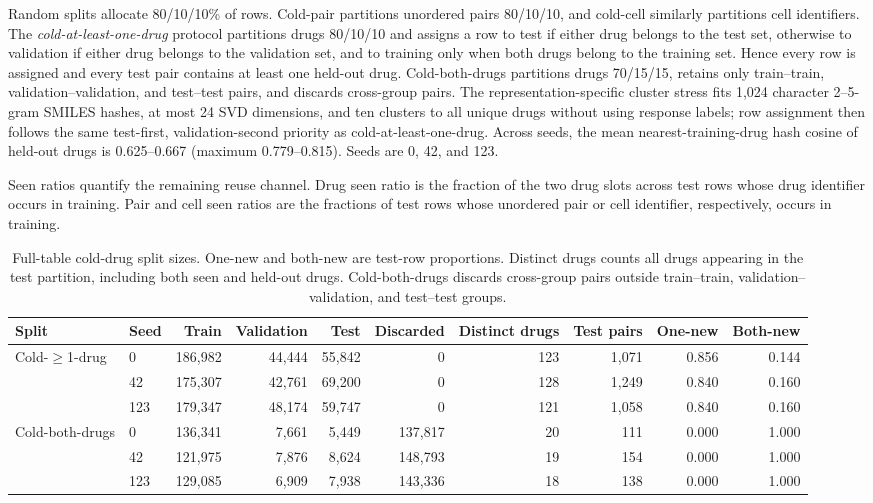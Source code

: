 \documentclass[conference]{IEEEtran}
\begin{document}
Random splits allocate 80/10/10\% of rows. Cold-pair partitions unordered pairs 80/10/10, and cold-cell similarly partitions cell identifiers. The \emph{cold-at-least-one-drug} protocol partitions drugs 80/10/10 and assigns a row to test if either drug belongs to the test set, otherwise to validation if either drug belongs to the validation set, and to training only when both drugs belong to the training set. Hence every row is assigned and every test pair contains at least one held-out drug. Cold-both-drugs partitions drugs 70/15/15, retains only train--train, validation--validation, and test--test pairs, and discards cross-group pairs. The representation-specific cluster stress fits 1,024 character 2--5-gram SMILES hashes, at most 24 SVD dimensions, and ten clusters to all unique drugs without using response labels; row assignment then follows the same test-first, validation-second priority as cold-at-least-one-drug. Across seeds, the mean nearest-training-drug hash cosine of held-out drugs is 0.625--0.667 (maximum 0.779--0.815). Seeds are 0, 42, and 123.

Seen ratios quantify the remaining reuse channel. Drug seen ratio is the fraction of the two drug slots across test rows whose drug identifier occurs in training. Pair and cell seen ratios are the fractions of test rows whose unordered pair or cell identifier, respectively, occurs in training.

\begin{table}[!t]
\centering
\caption{Full-table cold-drug split sizes. One-new and both-new are test-row proportions. Distinct drugs counts all drugs appearing in the test partition, including both seen and held-out drugs. Cold-both-drugs discards cross-group pairs outside train--train, validation--validation, and test--test groups.}
\label{tab:split-sizes}
\begin{tabular}{llrrrrrrrr}
\toprule
Split & Seed & Train & Validation & Test & Discarded & Distinct drugs & Test pairs & One-new & Both-new \\
\midrule
\multirow{3}{*}{Cold-$\geq$1-drug} & 0   & 186,982 & 44,444 & 55,842 & 0       & 123 & 1,071 & 0.856 & 0.144 \\
 & 42  & 175,307 & 42,761 & 69,200 & 0       & 128 & 1,249 & 0.840 & 0.160 \\
 & 123 & 179,347 & 48,174 & 59,747 & 0       & 121 & 1,058 & 0.840 & 0.160 \\
\midrule
\multirow{3}{*}{Cold-both-drugs} & 0   & 136,341 & 7,661 & 5,449 & 137,817 & 20 & 111 & 0.000 & 1.000 \\
 & 42  & 121,975 & 7,876 & 8,624 & 148,793 & 19 & 154 & 0.000 & 1.000 \\
 & 123 & 129,085 & 6,909 & 7,938 & 143,336 & 18 & 138 & 0.000 & 1.000 \\
\bottomrule
\end{tabular}
\end{table}
\end{document}
